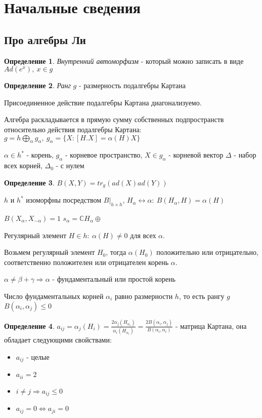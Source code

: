 \documentclass[a4paper,12pt]{article}
\theoremstyle{definition} \newtheorem{Def}{Определение}
\begin{document}
\section{Начальные сведения}
\subsection{Про алгебры Ли}
\label{sec:Lie}

\begin{Def} {\it Внутренний автоморфизм} - который можно записать в виде $Ad(e^x),\ x\in g$
\end{Def}
\begin{Def} {\it Ранг} $g$ - размерность подалгебры Картана
\end{Def}

Присоединенное действие подалгебры Картана диагонализуемо.

Алгебра раскладывается в прямую сумму собственных подпространств относительно действия подалгебры Картана: $g=h\bigoplus_{\alpha}g_{\alpha},\ g_{\alpha}=\{X:[H.X]=\alpha(H)X\}$

$\alpha\in h^*$ - корень, $g_{\alpha}$ - корневое пространство, $X\in g_{\alpha}$ - корневой вектор
$\Delta$ - набор всех корней, $\Delta_0$ - с нулем

\begin{Def}
  $ B(X,Y)=tr_g (ad(X)ad(Y))$
\end{Def}

$h$ и $h^*$ изоморфны посредством $\left.B\right|_{h\times h}$, $H_{\alpha}\leftrightarrow \alpha:\ B(H_{\alpha},H)=\alpha(H)$

$B(X_{\alpha},X_{-\alpha})=1$
$s_{\alpha}=\mathbb{C}H_{\alpha}\oplus $
 
Регулярный элемент $H\in h:\ \alpha(H)\neq 0$ для всех $\alpha$.

Возьмем регулярный элемент $H_0$, тогда $\alpha(H_0)$ положительно или отрицательно, соответственно положителен или отрицателен корень $\alpha$.

$\alpha\neq \beta+\gamma \Rightarrow \alpha$ - фундаментальный или простой корень

Число фундаментальных корней $\alpha_i$ равно размерности $h$, то есть рангу $g$
$B(\alpha_i,\alpha_j)\leq 0$

\begin{Def}
$a_{ij}=\alpha_j(H_i)=\frac{2\alpha_j(H_{\alpha_i})}{\alpha_i(H_{\alpha_i})}=\frac{2B(\alpha_i,\alpha_j)}{B(\alpha_i,\alpha_i)}$ - матрица Картана, она обладает следующими свойствами:
\begin{itemize}
\item $a_{ij}$ - целые
\item $a_{ii}=2$
\item $i\neq j \Rightarrow a_{ij}\leq 0$
\item $a_{ij}=0 \Leftrightarrow a_{ji}=0$
\end{itemize}
\end{Def}
\end{document}

